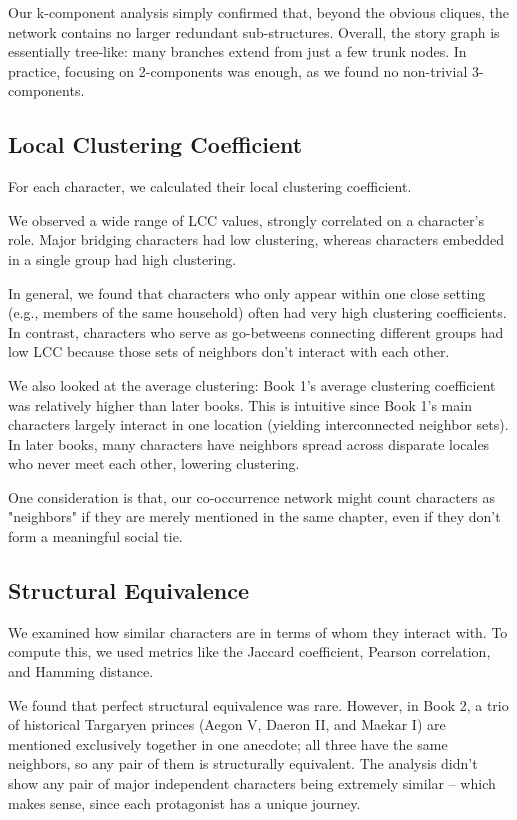 \documentclass[12pt, a4paper]{article}
\begin{document}
Our k-component analysis simply confirmed that, beyond the obvious cliques, the network contains no larger redundant sub-structures. Overall, the story graph is essentially tree-like: many branches extend from just a few trunk nodes. In practice, focusing on 2-components was enough, as we found no non-trivial 3-components.


\subsection*{Local Clustering Coefficient}
For each character, we calculated their local clustering coefficient.

We observed a wide range of LCC values, strongly correlated on a character's role. Major bridging characters had low clustering, whereas characters embedded in a single group had high clustering. 

In general, we found that characters who only appear within one close setting (e.g., members of the same household) often had very high clustering coefficients. In contrast, characters who serve as go-betweens connecting different groups had low LCC because those sets of neighbors don't interact with each other. 

We also looked at the average clustering: Book 1's average clustering coefficient was relatively higher than later books. This is intuitive since Book 1's main characters largely interact in one location (yielding interconnected neighbor sets). In later books, many characters have neighbors spread across disparate locales who never meet each other, lowering clustering. 

One  consideration is that, our co-occurrence network might count characters as "neighbors" if they are merely mentioned in the same chapter, even if they don't form a meaningful social tie.

\subsection*{Structural Equivalence} 
We examined how similar characters are in terms of whom they interact with. To compute this, we used metrics like the Jaccard coefficient, Pearson correlation, and Hamming distance. 

We found that perfect structural equivalence was rare. However, in Book 2, a trio of historical Targaryen princes (Aegon V, Daeron II, and Maekar I) are mentioned exclusively together in one anecdote; all three have the same neighbors, so any pair of them is structurally equivalent. 
The analysis didn't show any pair of major independent characters being extremely similar – which makes sense, since each protagonist has a unique journey. 
\end{document}
